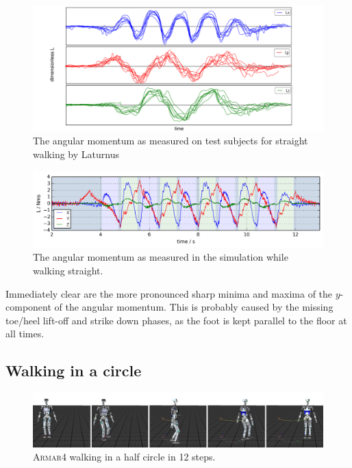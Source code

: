 \documentclass[english,ngerman]{KITreprt}
\newcommand{\name}[1]{\textsc{#1}}
\begin{document}
\begin{figure}[H]
\vspace*{-1em}
\includegraphics[width=\textwidth,resolution=300]{images/sophie_angular_momentum.png}
\caption{The angular momentum as measured on test subjects for straight walking by Laturnus \cite{laturnus2014}}
\label{img:sophie-angular-momentum}
\end{figure}

\begin{figure}[H]
\vspace*{-1em}
\includegraphics[width=\textwidth,resolution=300]{images/angular_momentum.png}
\caption{The angular momentum as measured in the simulation while walking straight.}
\label{img:angular-momentum}
\end{figure}

Immediately clear are the more pronounced sharp minima and maxima of the
$y$-component of the angular momentum. This is probably caused by the
missing toe/heel lift-off and strike down phases, as the foot is kept
parallel to the floor at all times.

\subsection{Walking in a circle}\label{walking-in-a-circle}

\begin{figure}[hbt]
\vspace*{-1em}
\includegraphics[width=\textwidth,resolution=300]{images/undisturbed_circle_thumbs.png}
\caption{\name{Armar4} walking in a half circle in 12 steps.}
\label{img:player-undisturbed-circle-thumbs}
\end{figure}
\end{document}
